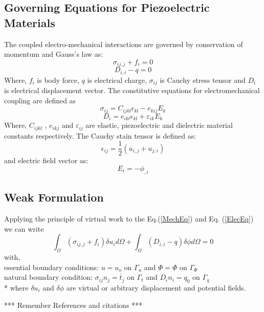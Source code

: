 \documentclass[12pt]{article}
\begin{document}
\subsection{Governing Equations for Piezoelectric Materials}
The coupled electro-mechanical interactions are governed by conservation of momentum and Gauss's law as:
\begin{equation} \label{MechEq}
\sigma_{ij,j} + f_i = 0
\end{equation} 
\begin{equation} \label{ElecEq}
D_{i,i} - q = 0
\end{equation}
Where, $ f_i $ is body force, $ q $ is electrical charge, $ \sigma_{ij} $ is Cauchy stress tensor and $ D_i $ is electrical displacement vector.
The constitutive equations for electromechanical coupling are defined as
\begin{equation}
\sigma_{ij} = C_{ijkl} \epsilon_{kl} - e_{kij} E_k
\end{equation}
\begin{equation}
D_i = e_{ikl} \epsilon_{kl} + \varepsilon_{ik} E_k
\end{equation}
Where, $ C_{ijkl} $ , $ e_{ikj} $ and $ \varepsilon_{ij} $ are elastic, piezoelectric and dielectric material constants respectively. The Cauchy stain tensor is defined as:
\begin{equation}
\epsilon_{ij} = \frac{1}{2} (u_{i,j} + u_{j,i})
\end{equation}
and electric field vector as:
\begin{equation}
E_i = -\phi_{,i}
\end{equation}
\subsection{Weak Formulation}
Applying the principle of virtual work to the Eq.(\ref{MechEq})
and Eq. (\ref{ElecEq}) we can write
\begin{equation}
\int_\Omega ( \sigma_{ij,j} + f_i ) \delta u_i d\Omega + \int_\Omega (D_{i,i} - q ) \delta \phi d\Omega = 0
\end{equation}
with, \\
essential boundary conditions:
$u = u_o$ on $\Gamma_u$ and $\Phi=\Phi$ on $\Gamma_\Phi$ \\
natural boundary condition:
$\sigma_{ij}n_j = \bar{t}_j$ on $\Gamma_t$ and $D_i n_i = q_0$ on $\Gamma_q$ \\*
where $\delta u_i$ and $\delta \phi$ are virtual or arbitrary displacement and potential fields.






\noindent
*** Remember References and citations ***
\end{document}
